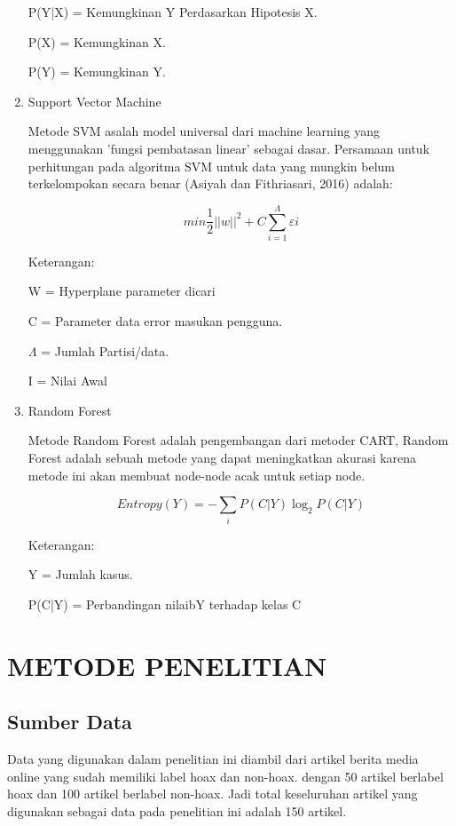 \documentclass{article}
\begin{document}
\begin{enumerate}[{a.}]
P(Y|X) = Kemungkinan Y Perdasarkan Hipotesis X.

P(X) = Kemungkinan X.

P(Y) = Kemungkinan Y.

\item Support Vector Machine

Metode SVM asalah model universal dari machine learning yang menggunakan 'fungsi
pembatasan linear' sebagai dasar.
Persamaan untuk perhitungan pada algoritma SVM untuk data yang mungkin belum terkelompokan secara benar (Asiyah dan Fithriasari, 2016) adalah:

$$ min\frac{1}{2}||w||^{2}+C\sum ^{\Lambda }_{i=1}\varepsilon i $$

Keterangan:

W = Hyperplane parameter dicari

C = Parameter data error masukan pengguna.

$ \Lambda  $ = Jumlah Partisi/data.

I = Nilai Awal

\item Random Forest

Metode Random Forest adalah pengembangan dari metoder CART, Random Forest
adalah sebuah metode yang dapat meningkatkan akurasi karena metode ini akan
membuat node-node acak untuk setiap node.

$$ Entropy (Y) = -\sum_{i}P(C|Y)\log_{2}P(C|Y) $$ 

Keterangan:

Y = Jumlah kasus.

P(C|Y) = Perbandingan nilaibY terhadap kelas C

\end{enumerate}

\section{METODE PENELITIAN}
\subsection{Sumber Data}
Data yang digunakan dalam penelitian ini diambil dari artikel berita media online yang 
sudah memiliki label hoax dan non-hoax. dengan 50 artikel berlabel hoax dan 100 
artikel berlabel non-hoax. Jadi total keseluruhan artikel yang digunakan sebagai data 
pada penelitian ini adalah 150 artikel.
\end{document}

